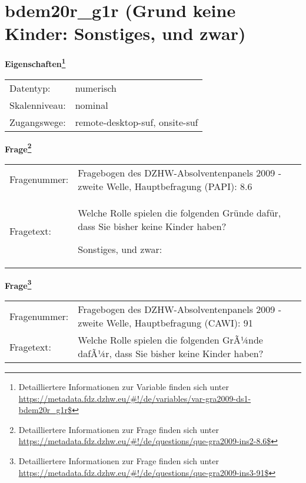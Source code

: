 
    \setcounter{footnote}{0}

    \vspace*{-1.8cm}
	\section{bdem20r\_g1r (Grund keine Kinder: Sonstiges, und zwar)}
	\label{section:bdem20r_g1r}



    \vspace*{0.5cm}
    \noindent\textbf{Eigenschaften\footnote{Detailliertere Informationen zur Variable finden sich unter
		\url{https://metadata.fdz.dzhw.eu/\#!/de/variables/var-gra2009-ds1-bdem20r_g1r$}}}\\
	\begin{tabularx}{\hsize}{@{}lX}
	Datentyp: & numerisch \\
	Skalenniveau: & nominal \\
	Zugangswege: &
	  remote-desktop-suf, 
	  onsite-suf
 \\
    \end{tabularx}



				\vspace*{0.5cm}
                \noindent\textbf{Frage\footnote{Detailliertere Informationen zur Frage finden sich unter
		              \url{https://metadata.fdz.dzhw.eu/\#!/de/questions/que-gra2009-ins2-8.6$}}}\\
				\begin{tabularx}{\hsize}{@{}lX}
					Fragenummer: &
					  Fragebogen des DZHW-Absolventenpanels 2009 - zweite Welle, Hauptbefragung (PAPI):
					  8.6
 \\
					Fragetext: & Welche Rolle spielen die folgenden Gründe dafür, dass Sie bisher keine Kinder haben?\par  Sonstiges, und zwar: \\
				\end{tabularx}
				\vspace*{0.5cm}
                \noindent\textbf{Frage\footnote{Detailliertere Informationen zur Frage finden sich unter
		              \url{https://metadata.fdz.dzhw.eu/\#!/de/questions/que-gra2009-ins3-91$}}}\\
				\begin{tabularx}{\hsize}{@{}lX}
					Fragenummer: &
					  Fragebogen des DZHW-Absolventenpanels 2009 - zweite Welle, Hauptbefragung (CAWI):
					  91
 \\
					Fragetext: & Welche Rolle spielen die folgenden GrÃ¼nde dafÃ¼r, dass Sie bisher keine Kinder haben? \\
				\end{tabularx}





